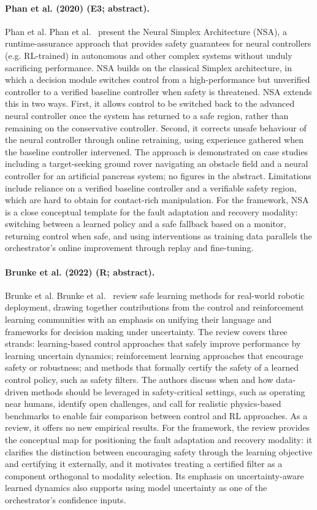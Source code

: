 \documentclass[10pt,a4paper]{article}
\begin{document}
\paragraph{Phan et al. (2020) (E3; abstract).} Phan et al. Phan et al.~\cite{Phan2020} present the Neural Simplex Architecture (NSA), a runtime-assurance approach that provides safety guarantees for neural controllers (e.g. RL-trained) in autonomous and other complex systems without unduly sacrificing performance. NSA builds on the classical Simplex architecture, in which a decision module switches control from a high-performance but unverified controller to a verified baseline controller when safety is threatened. NSA extends this in two ways. First, it allows control to be switched back to the advanced neural controller once the system has returned to a safe region, rather than remaining on the conservative controller. Second, it corrects unsafe behaviour of the neural controller through online retraining, using experience gathered when the baseline controller intervened. The approach is demonstrated on case studies including a target-seeking ground rover navigating an obstacle field and a neural controller for an artificial pancreas system; no figures in the abstract. Limitations include reliance on a verified baseline controller and a verifiable safety region, which are hard to obtain for contact-rich manipulation. For the framework, NSA is a close conceptual template for the fault adaptation and recovery modality: switching between a learned policy and a safe fallback based on a monitor, returning control when safe, and using interventions as training data parallels the orchestrator's online improvement through replay and fine-tuning.

\paragraph{Brunke et al. (2022) (R; abstract).} Brunke et al. Brunke et al.~\cite{Brunke2022} review safe learning methods for real-world robotic deployment, drawing together contributions from the control and reinforcement learning communities with an emphasis on unifying their language and frameworks for decision making under uncertainty. The review covers three strands: learning-based control approaches that safely improve performance by learning uncertain dynamics; reinforcement learning approaches that encourage safety or robustness; and methods that formally certify the safety of a learned control policy, such as safety filters. The authors discuss when and how data-driven methods should be leveraged in safety-critical settings, such as operating near humans, identify open challenges, and call for realistic physics-based benchmarks to enable fair comparison between control and RL approaches. As a review, it offers no new empirical results. For the framework, the review provides the conceptual map for positioning the fault adaptation and recovery modality: it clarifies the distinction between encouraging safety through the learning objective and certifying it externally, and it motivates treating a certified filter as a component orthogonal to modality selection. Its emphasis on uncertainty-aware learned dynamics also supports using model uncertainty as one of the orchestrator's confidence inputs.
\end{document}
